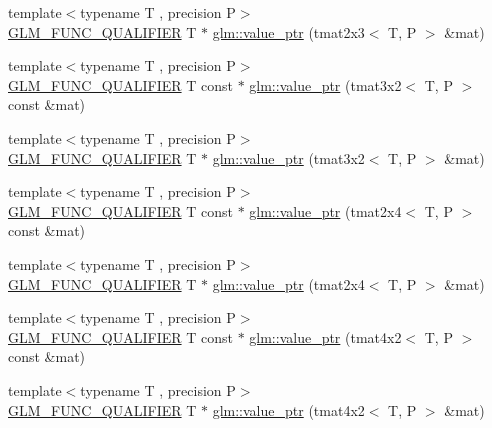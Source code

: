 \begin{DoxyCompactItemize}
\item 
{\footnotesize template$<$typename T , precision P$>$ }\\\mbox{\hyperlink{setup_8hpp_a33fdea6f91c5f834105f7415e2a64407}{G\+L\+M\+\_\+\+F\+U\+N\+C\+\_\+\+Q\+U\+A\+L\+I\+F\+I\+ER}} T $\ast$ \mbox{\hyperlink{group__gtc__type__ptr_ga36fb9a17664c8b6848a5d005e4068a2f}{glm\+::value\+\_\+ptr}} (tmat2x3$<$ T, P $>$ \&mat)
\item 
{\footnotesize template$<$typename T , precision P$>$ }\\\mbox{\hyperlink{setup_8hpp_a33fdea6f91c5f834105f7415e2a64407}{G\+L\+M\+\_\+\+F\+U\+N\+C\+\_\+\+Q\+U\+A\+L\+I\+F\+I\+ER}} T const  $\ast$ \mbox{\hyperlink{group__gtc__type__ptr_ga398202d6ce304deb7da50badde85ee41}{glm\+::value\+\_\+ptr}} (tmat3x2$<$ T, P $>$ const \&mat)
\item 
{\footnotesize template$<$typename T , precision P$>$ }\\\mbox{\hyperlink{setup_8hpp_a33fdea6f91c5f834105f7415e2a64407}{G\+L\+M\+\_\+\+F\+U\+N\+C\+\_\+\+Q\+U\+A\+L\+I\+F\+I\+ER}} T $\ast$ \mbox{\hyperlink{group__gtc__type__ptr_gad6a737f57febdef255873f6a44d0db0e}{glm\+::value\+\_\+ptr}} (tmat3x2$<$ T, P $>$ \&mat)
\item 
{\footnotesize template$<$typename T , precision P$>$ }\\\mbox{\hyperlink{setup_8hpp_a33fdea6f91c5f834105f7415e2a64407}{G\+L\+M\+\_\+\+F\+U\+N\+C\+\_\+\+Q\+U\+A\+L\+I\+F\+I\+ER}} T const  $\ast$ \mbox{\hyperlink{group__gtc__type__ptr_ga2336cd68e72b0d295c8cd33eb1588480}{glm\+::value\+\_\+ptr}} (tmat2x4$<$ T, P $>$ const \&mat)
\item 
{\footnotesize template$<$typename T , precision P$>$ }\\\mbox{\hyperlink{setup_8hpp_a33fdea6f91c5f834105f7415e2a64407}{G\+L\+M\+\_\+\+F\+U\+N\+C\+\_\+\+Q\+U\+A\+L\+I\+F\+I\+ER}} T $\ast$ \mbox{\hyperlink{group__gtc__type__ptr_ga0d745a55255710933effd6391307f681}{glm\+::value\+\_\+ptr}} (tmat2x4$<$ T, P $>$ \&mat)
\item 
{\footnotesize template$<$typename T , precision P$>$ }\\\mbox{\hyperlink{setup_8hpp_a33fdea6f91c5f834105f7415e2a64407}{G\+L\+M\+\_\+\+F\+U\+N\+C\+\_\+\+Q\+U\+A\+L\+I\+F\+I\+ER}} T const  $\ast$ \mbox{\hyperlink{group__gtc__type__ptr_ga1de002422f32c6da9d65d3f257f37196}{glm\+::value\+\_\+ptr}} (tmat4x2$<$ T, P $>$ const \&mat)
\item 
{\footnotesize template$<$typename T , precision P$>$ }\\\mbox{\hyperlink{setup_8hpp_a33fdea6f91c5f834105f7415e2a64407}{G\+L\+M\+\_\+\+F\+U\+N\+C\+\_\+\+Q\+U\+A\+L\+I\+F\+I\+ER}} T $\ast$ \mbox{\hyperlink{group__gtc__type__ptr_ga0e62660f9066864568cd74d76d528a6e}{glm\+::value\+\_\+ptr}} (tmat4x2$<$ T, P $>$ \&mat)

\end{DoxyCompactItemize}
